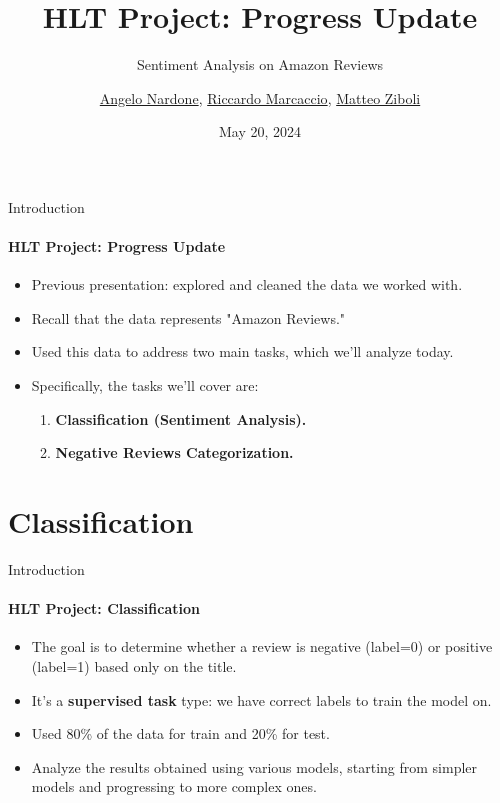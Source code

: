 \documentclass{beamer}
\title{HLT Project: Progress Update}
\subtitle{Sentiment Analysis on Amazon Reviews}
\author{\href{mailto:a.nardone5@studenti.unipi.it}{Angelo Nardone}, \href{mailto:r.marcaccio@studenti.unipi.it}{Riccardo Marcaccio}, \href{mailto: m.ziboli@studenti.unipi.it}{Matteo Ziboli}}
\date{May 20, 2024}
\theoremstyle{definition}
\theoremstyle{plain}
\begin{document}
\maketitle


\begin{frame}{Introduction}
\framesubtitle{HLT Project: Progress Update}
{\small 
\begin{itemize}
    \item Previous presentation: explored and cleaned the data we worked with.
    \item Recall that the data represents "Amazon Reviews."
    \item Used this data to address two main tasks, which we'll analyze today.
    \item Specifically, the tasks we'll cover are:
    \begin{enumerate}
        \item \textbf{Classification (Sentiment Analysis).}
        \item \textbf{Negative Reviews Categorization.}
    \end{enumerate}
\end{itemize}
}
\end{frame}

\section{Classification}

\begin{frame}{Introduction}
\framesubtitle{HLT Project: Classification}
{\small 
\begin{itemize}
\item The goal is to determine whether a review is negative (label=0) or positive (label=1) based only on the title.
\item It's a \textbf{supervised task} type: we have correct labels to train the model on.
\item Used 80\% of the data for train and 20\% for test. 
\item Analyze the results obtained using various models, starting from simpler models and progressing to more complex ones.
\end{itemize}
}
\end{frame}
\end{document}
